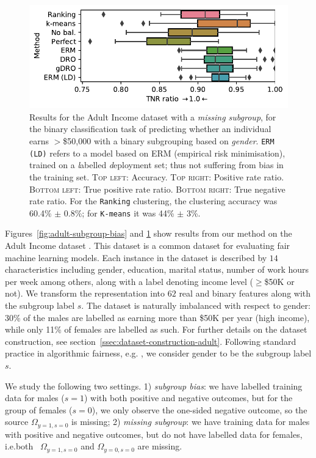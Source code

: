\begin{figure}[p]
    \includegraphics[width=\columnwidth]{paper3/figures/adult_miss_s_tnrr.pdf}
    \caption{%
    Results for the Adult Income dataset with a \emph{missing subgroup},
    for the binary classification task of predicting whether an individual earns $>$\$50,000 with a binary subgrouping based on \emph{gender}.
    \texttt{ERM (LD)} refers to a model based on ERM (empirical risk minimisation),
    trained on a \emph{l}abelled \emph{d}eployment set; thus not suffering from bias in the training set.
    \textsc{Top left}: Accuracy.
    \textsc{Top right}: Positive rate ratio.
    \textsc{Bottom left}: True positive rate ratio.
    \textsc{Bottom right}: True negative rate ratio.
    For the \texttt{Ranking} clustering, the clustering accuracy was 60.4\% $\pm$ 0.8\%;
    for \texttt{K-means} it was 44\% $\pm$ 3\%.
    }%
    \label{fig:adult-missing-subgroup}
\end{figure}
Figures~\ref{fig:adult-subgroup-bias} and \ref{fig:adult-missing-subgroup} show results from our method on the Adult Income dataset \cite{Dua:2017}.
This dataset is a common dataset for evaluating fair machine learning models. 
Each instance in the dataset is described by $14$ characteristics including gender, education, marital status, number of work hours per week among others, along with a label denoting income level ($\geq$\$50K or not). 
We transform the representation into $62$ real and binary features along with the subgroup label $s$. %
The dataset is naturally imbalanced with respect to gender: 30\% of the males are labelled as earning more than \$50K per year (high income), while only 11\% of females are labelled as such.
For further details on the dataset construction, see section~\ref{ssec:dataset-construction-adult}.
%
Following standard practice in algorithmic fairness, e.g. \citet{zemel2013learning}, we consider gender to be the subgroup label $s$.

We study the following two settings.
1) \emph{subgroup bias}: we have labelled training data for males ($s=1$) with both positive and negative outcomes, but for the group of females ($s=0$), we only observe the one-sided negative outcome, so the source $\Omega_{y=1,s=0}$ is missing;
2) \emph{missing subgroup}: we have training data for males with positive and negative outcomes, but do not have labelled data for females, i.e.both \ $\Omega_{y=1,s=0}$ and $\Omega_{y=0,s=0}$ are missing.

